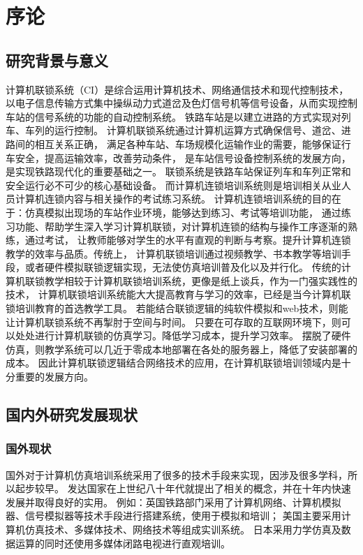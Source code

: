 \section{序论}
\subsection{研究背景与意义}
计算机联锁系统（CI）是综合运用计算机技术、网络通信技术和现代控制技术，
以电子信息传输方式集中操纵动力式道岔及色灯信号机等信号设备，从而实现控制车站的信号系统的功能的自动控制系统。
铁路车站是以建立进路的方式实现对列车、车列的运行控制。
计算机联锁系统通过计算机运算方式确保信号、道岔、进路间的相互关系正确，
满足各种车站、车场规模化运输作业的需要，能够保证行车安全，提高运输效率，改善劳动条件，
是车站信号设备控制系统的发展方向，是实现铁路现代化的重要基础之一。
联锁系统是铁路车站保证列车和车列正常和安全运行必不可少的核心基础设备。
而计算机连锁培训系统则是培训相关从业人员计算机连锁内容与相关操作的考试练习系统。
计算机连锁培训系统的目的在于：仿真模拟出现场的车站作业环境，能够达到练习、考试等培训功能，
通过练习功能、帮助学生深入学习计算机联锁，对计算机连锁的结构与操作工序逐渐的熟练，通过考试，
让教师能够对学生的水平有直观的判断与考察。提升计算机连锁教学的效率与品质。传统上，
计算机联锁培训通过视频教学、书本教学等培训手段，或者硬件模拟联锁逻辑实现，无法使仿真培训普及化以及并行化。
传统的计算机联锁教学相较于计算机联锁培训系统，更像是纸上谈兵，作为一门强实践性的技术，
计算机联锁培训系统能大大提高教育与学习的效率，已经是当今计算机联锁培训教育的首选教学工具\cite{intercnki}。
若能结合联锁逻辑的纯软件模拟和web技术，则能让计算机联锁系统不再掣肘于空间与时间。
只要在可存取的互联网环境下，则可以处处进行计算机联锁的仿真学习。降低学习成本，提升学习效率。
摆脱了硬件仿真，则教学系统可以几近于零成本地部署在各处的服务器上，降低了安装部署的成本。
因此计算机联锁逻辑结合网络技术的应用，在计算机联锁培训领域内是十分重要的发展方向。

\subsection{国内外研究发展现状}
\subsubsection{国外现状}
国外对于计算机仿真培训系统采用了很多的技术手段来实现，因涉及很多学科，所以起步较早。
发达国家在上世纪八十年代就提出了相关的概念，并在十年内快速发展并取得良好的实用。
例如：英国铁路部门采用了计算机网络、计算机模拟器、信号模拟器等技术手段进行搭建系统，使用于模拟和培训；
美国主要采用计算机仿真技术、多媒体技术、网络技术等组成实训系统。
日本采用力学仿真及数据运算的同时还使用多媒体闭路电视进行直观培训。\cite{intercnki}

